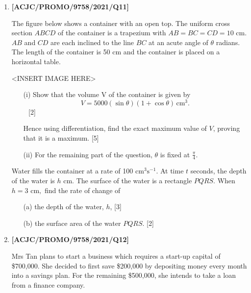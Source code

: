 \documentclass[twoside,english]{article}
\begin{document}
\begin{enumerate}
 \newpage 

\item \textbf{{[}ACJC/PROMO/9758/2021/Q11{]}}

The figure below shows a container with an open top. The uniform cross
section $ABCD$ of the container is a trapezium with $AB=BC=CD=10$
cm. $AB$ and $CD$ are each inclined to the line $BC$ at an acute
angle of $\theta$ radians. The length of the container is 50 cm and
the container is placed on a horizontal table.
\noindent \begin{center}
<INSERT IMAGE HERE>
\par\end{center}
\begin{enumerate}
\item[(i)]  Show that the volume V of the container is given by 
\[
V=5000\left(\sin\theta\right)(1+\cos\theta)\,\text{cm}^{3}.
\]
\textcolor{white}{\_}\hfill{}{[}2{]}

Hence using differentiation, find the exact maximum value of $V$,
proving that it is a maximum. \hfill{}{[}5{]}
\item[(ii)]  For the remaining part of the question, $\theta$ is fixed at $\frac{\pi}{4}$. 
\end{enumerate}
Water fills the container at a rate of 100 $\text{cm}^{3}\text{s}^{-1}$.
At time $t$ seconds, the depth of the water is $h$ cm. The surface
of the water is a rectangle $PQRS$. When $h=3\text{ cm},$ find the
rate of change of 
\begin{enumerate}
\item[(a)]  the depth of the water, $h$, \hfill{}{[}3{]}
\item[(b)]  the surface area of the water $PQRS$. \hfill{}{[}2{]}
\end{enumerate}

 \newpage 

\item \textbf{{[}ACJC/PROMO/9758/2021/Q12{]}}

Mrs Tan plans to start a business which requires a start-up capital
of \$700,000. She decided to first save \$200,000 by depositing money
every month into a savings plan. For the remaining \$500,000, she
intends to take a loan from a finance company. 


\end{enumerate}
\end{document}
